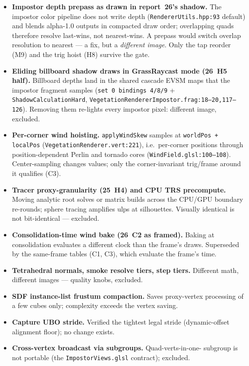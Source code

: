 \documentclass[11pt,a4paper]{article}
\begin{document}
\begin{itemize}[leftmargin=1.4em,itemsep=2pt]
\item \textbf{Impostor depth prepass as drawn in report~26's shadow.}
The impostor color pipeline does not write depth
(\texttt{RendererUtils.hpp:93} default) and blends alpha-1.0 outputs in
compacted draw order; overlapping quads therefore resolve last-wins, not
nearest-wins. A prepass would switch overlap resolution to nearest ---
a fix, but a \emph{different image}. Only the tap reorder (M9) and the
trig hoist (H8) survive the gate.
\item \textbf{Eliding billboard shadow draws in GrassRaycast mode (26~H5
half).} Billboard depths land in the shared cascade EVSM maps that the
impostor fragment samples (\texttt{set 0 bindings 4/8/9} +
\texttt{ShadowCalculationHard},
\texttt{VegetationRendererImpostor.frag:18--20,117--126}). Removing them
re-lights every impostor pixel: different image, excluded.
\item \textbf{Per-corner wind hoisting.} \texttt{applyWindSkew} samples at
\texttt{worldPos + localPos} (\texttt{VegetationRenderer.vert:221}),
i.e.\ per-corner positions through position-dependent Perlin and tornado
cores (\texttt{WindField.glsl:100--108}). Center-sampling changes values;
only the corner-invariant trig/frame around it qualifies (C3).
\item \textbf{Tracer proxy-granularity (25~H4) and CPU TRS precompute.}
Moving analytic root solves or matrix builds across the CPU/GPU boundary
re-rounds; sphere tracing amplifies ulps at silhouettes. Visually
identical is not bit-identical --- excluded.
\item \textbf{Consolidation-time wind bake (26~C2 as framed).} Baking at
consolidation evaluates a different clock than the frame's draws.
Superseded by the same-frame tables (C1, C3), which evaluate the frame's
time.
\item \textbf{Tetrahedral normals, smoke resolve tiers, step tiers.}
Different math, different images --- quality knobs, excluded.
\item \textbf{SDF instance-list frustum compaction.} Saves proxy-vertex
processing of a few cubes only; complexity exceeds the vertex saving.
\item \textbf{Capture UBO stride.} Verified the tightest legal stride
(dynamic-offset alignment floor); no change exists.
\item \textbf{Cross-vertex broadcast via subgroups.} Quad-verts-in-one-
subgroup is not portable (the \texttt{ImpostorViews.glsl} contract);
excluded.
\end{itemize}
\end{document}
